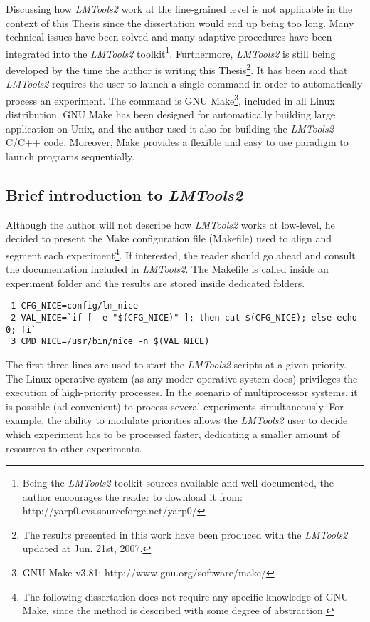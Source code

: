 Discussing how \emph{LMTools2} work at the fine-grained level is not applicable
in the context of this Thesis since the dissertation would end up being
too long.
Many technical issues have been solved and many adaptive procedures have been
integrated into the \emph{LMTools2} toolkit\footnote{Being the \emph{LMTools2}
toolkit sources available and well documented, the author encourages the reader
to download it from: http://yarp0.cvs.sourceforge.net/yarp0/}.
Furthermore, \emph{LMTools2} is still being developed by the time the author
is writing this Thesis\footnote{The results presented in this work have been
produced with the \emph{LMTools2} updated at Jun. 21st, 2007.}.
It has been said that \emph{LMTools2} requires the user to launch a single
command in order to automatically process an experiment.
The command is GNU Make\footnote{GNU Make v3.81:
http://www.gnu.org/software/make/}, included in all Linux distribution. 
GNU Make has been designed for automatically building large application on 
Unix, and the author used it also for building the \emph{LMTools2} C/C++ code.
Moreover, Make provides a flexible and easy to use paradigm to launch
programs sequentially.

\subsection{Brief introduction to \emph{LMTools2}}
Although the author will not describe how \emph{LMTools2} works at low-level, he
decided to present the Make configuration file (Makefile) used to align and
segment each experiment\footnote{The following dissertation does not require 
any specific knowledge of GNU Make, since the method is described with some
degree of abstraction.}. 
If interested, the reader should go ahead and consult the
documentation included in \emph{LMTools2}.
The Makefile is called inside an experiment folder and the results are stored
inside dedicated folders.

\begin{scriptsize}
\begin{verbatim}
 1 CFG_NICE=config/lm_nice
 2 VAL_NICE=`if [ -e "$(CFG_NICE)" ]; then cat $(CFG_NICE); else echo 0; fi`
 3 CMD_NICE=/usr/bin/nice -n $(VAL_NICE)
\end{verbatim}
\end{scriptsize}
The first three lines are used to start the \emph{LMTools2} scripts at a given
priority. The Linux operative system (as any moder operative system does) 
privileges the execution of high-priority processes. 
In the scenario of multiprocessor systems, it is possible (ad convenient) to 
process several experiments simultaneously. 
For example, the ability to modulate priorities allows the \emph{LMTools2} 
user to decide which experiment has to be processed faster, dedicating a 
smaller amount of resources to other experiments.

